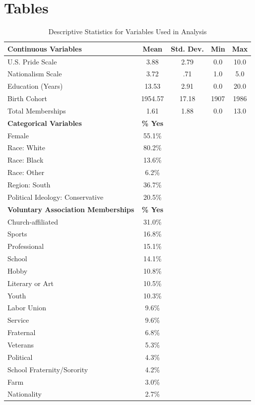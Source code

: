 \documentclass[12pt,letterpaper]{article}
\begin{document}
\clearpage
\section*{Tables}

\begin{table}[htbp]
\centering
\caption{Descriptive Statistics for Variables Used in Analysis}
\label{tab:descriptives}
\begin{tabular}{lcccc}
\toprule
\textbf{Continuous Variables} & \textbf{Mean} & \textbf{Std. Dev.} & \textbf{Min} & \textbf{Max} \\
\midrule
U.S. Pride Scale & 3.88 & 2.79 & 0.0 & 10.0 \\
Nationalism Scale & 3.72 & .71 & 1.0 & 5.0 \\
Education (Years) & 13.53 & 2.91 & 0.0 & 20.0 \\
Birth Cohort & 1954.57 & 17.18 & 1907 & 1986 \\
Total Memberships & 1.61 & 1.88 & 0.0 & 13.0 \\
\midrule
\textbf{Categorical Variables} & \textbf{\% Yes} & & & \\
\midrule
Female & 55.1\% & & & \\
Race: White & 80.2\% & & & \\
Race: Black & 13.6\% & & & \\
Race: Other & 6.2\% & & & \\
Region: South & 36.7\% & & & \\
Political Ideology: Conservative & 20.5\% & & & \\
\midrule
\textbf{Voluntary Association Memberships} & \textbf{\% Yes} & & & \\
\midrule
Church-affiliated & 31.0\% & & & \\
Sports & 16.8\% & & & \\
Professional & 15.1\% & & & \\
School & 14.1\% & & & \\
Hobby & 10.8\% & & & \\
Literary or Art & 10.5\% & & & \\
Youth & 10.3\% & & & \\
Labor Union & 9.6\% & & & \\
Service & 9.6\% & & & \\
Fraternal & 6.8\% & & & \\
Veterans & 5.3\% & & & \\
Political & 4.3\% & & & \\
School Fraternity/Sorority & 4.2\% & & & \\
Farm & 3.0\% & & & \\
Nationality & 2.7\% & & & \\
\bottomrule
\end{tabular}
\end{table}
\end{document}
